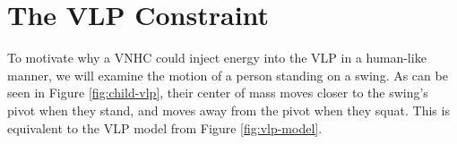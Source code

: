 
\section{The VLP Constraint}
To motivate why a VNHC could inject energy into the VLP in a human-like
manner, we will examine the motion of a person standing on a swing.
As can be seen in Figure \ref{fig:child-vlp}, their center of mass moves closer
to the swing's pivot when they stand, and moves away from the pivot when they
squat.
This is equivalent to the VLP model from Figure \ref{fig:vlp-model}.
